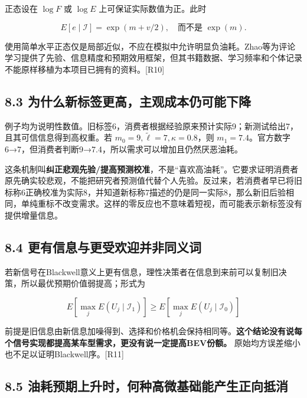 \documentclass[
  11pt,
]{article}
\begin{document}
正态设在 \(\log F\) 或 \(\log E\) 上可保证实际数值为正。此时

\[
E[e\mid\mathcal I]=\exp(m+v/2),
\quad\text{而不是 }\exp(m). \tag{28}
\]

使用简单水平正态仅是局部近似，不应在模拟中允许明显负油耗。Zhao等为评论学习提供了先验、信息精度和预期效用框架，但其书籍数据、学习频率和个体记录不能原样移植为本项目已拥有的资料。{[}R10{]}

\subsection{8.3
为什么新标签更高，主观成本仍可能下降}\label{ux4e3aux4ec0ux4e48ux65b0ux6807ux7b7eux66f4ux9ad8ux4e3bux89c2ux6210ux672cux4ecdux53efux80fdux4e0bux964d}

例子均为说明性数值。旧标签6，消费者根据经验原来预计实际9；新测试给出7，且其可信信息得到高权重。若
\(m_0=9,\widetilde\ell=7,\kappa=0.8\)，则
\(m_1=7.4\)。官方数字6→7，但消费者判断9→7.4，所以需求可以增加且仍然厌恶油耗。

这条机制叫\textbf{纠正悲观先验/提高预测校准}，不是``喜欢高油耗''。它要求证明消费者原先确实较悲观，不能把研究者预测值代替个人先验。反过来，若消费者早已将旧标称6正确校准为实际8，并知道新标称7描述的仍是同一实际8，那么新旧后验相同，单纯重标不改变需求。这样的零反应也不意味着短视，而可能表示新标签没有提供增量信息。

\subsection{8.4
更有信息与更受欢迎并非同义词}\label{ux66f4ux6709ux4fe1ux606fux4e0eux66f4ux53d7ux6b22ux8fceux5e76ux975eux540cux4e49ux8bcd}

若新信号在Blackwell意义上更有信息，理性决策者在信息到来前可以复制旧决策，所以最优预期价值弱提高；形式为

\[
E[\max_j E(U_j\mid\mathcal I_1)]
\geq E[\max_j E(U_j\mid\mathcal I_0)]
\tag{29}
\]

前提是旧信息由新信息加噪得到、选择和价格机会保持相同等。\textbf{这个结论没有说每个信号实现都提高某车型需求，更没有说一定提高BEV份额。}
原始均方误差缩小也不足以证明Blackwell序。{[}R11{]}

\subsection{8.5
油耗预期上升时，何种高微基础能产生正向抵消}\label{ux6cb9ux8017ux9884ux671fux4e0aux5347ux65f6ux4f55ux79cdux9ad8ux5faeux57faux7840ux80fdux4ea7ux751fux6b63ux5411ux62b5ux6d88}
\end{document}
